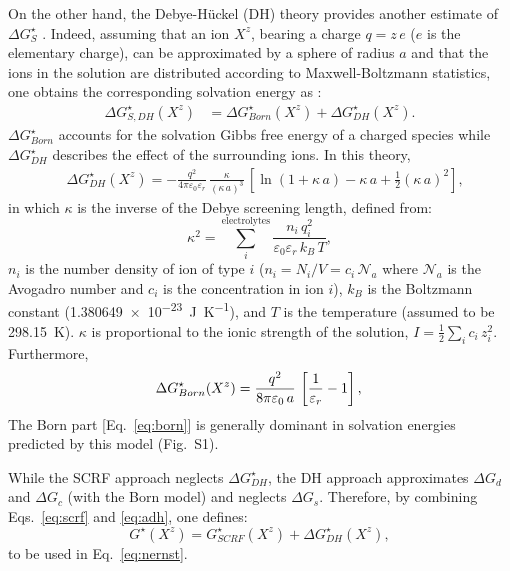 \documentclass[review,preprint]{elsarticle}
\begin{document}
On the other hand, the Debye-Hückel (DH) theory provides another estimate of $\Delta G_{S}^\star$ \cite{bockrisModernElectrochemistryIonics1998}. Indeed, assuming that an ion $X^z$, bearing a charge $q = z\,e$ ($e$ is the elementary charge), can be approximated by a sphere of radius $a$ and that the ions in the solution are distributed according to Maxwell-Boltzmann statistics, one obtains the corresponding solvation energy as \cite{kontogeorgisDebyeHuckelTheoryIts2018,silvaTrueHuckelEquation2022,silvaImprovingBornEquation2024}:\begin{align}
	\Delta G^\star_{S,DH}(X^z)
	&= \Delta G^\star_{Born}(X^z) + \Delta G^\star_{DH}(X^z).\label{eq:adh}
\end{align}
$\Delta G^\star_{Born}$ accounts for the solvation Gibbs free energy of a charged species while $ \Delta G^\star_{DH}$ describes the effect of the surrounding ions. In this theory,
\begin{align}
	&\Delta G^\star_{DH}(X^z) = -\frac{q^2}{4\pi\varepsilon_0\varepsilon_r}\,\frac{\kappa}{(\kappa\,a)^3}\,\left[\ln(1+\kappa\,a)-\kappa\,a+\frac{1}{2}(\kappa\,a)^2\right],\label{eq:dh} \end{align}
in which $\kappa$ is the inverse of the Debye screening length, defined from:\begin{equation}
	\kappa^2 = \sum_i^{\text{electrolytes}} \frac{n_i\,q_i^2}{\varepsilon_0\varepsilon_r\,k_B\,T}, \label{eq:kappa2}
\end{equation}
$n_i$ is the number density of ion of type $i$ ($n_i = N_i / V = c_i\,\mathcal{N}_a$ where $\mathcal{N}_a$ is the Avogadro number and $c_i$ is the concentration in ion $i$), $k_B$ is the Boltzmann constant (\SI{1.380649e-23}{\joule\per\kelvin}), and $T$ is the temperature (assumed to be \SI{298.15}{\kelvin}).  $\kappa$ is  proportional to the ionic strength of the solution, $I = \frac{1}{2}\sum_i c_i\,z_i^2$. 
Furthermore,
\begin{equation}
	\Delta G^\star_{Born}(X^z) =\frac{q^2}{8\pi\varepsilon_0\,a}\,\left[\frac{1}{\varepsilon_r}-1\right], \label{eq:born}\\
\end{equation}
 The Born part [Eq.~\eqref{eq:born}] is generally dominant in solvation energies predicted by this model (Fig.~S1).
 
 While the SCRF approach neglects $\Delta G^\star_{DH}$, the DH approach approximates $\Delta G_{d}$ and $\Delta G_{c}$ (with the Born model) and neglects $\Delta G_{s}$. Therefore, by combining Eqs.~\eqref{eq:scrf} and \eqref{eq:adh}, one defines:\begin{equation}
	G^\star(X^z) = G^\star_{SCRF}(X^z) + \Delta G^\star_{DH}(X^z), \label{eq:gtot}
\end{equation}
to be used in Eq.~\eqref{eq:nernst}.
\end{document}
